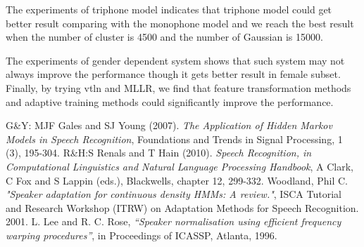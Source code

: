 \documentclass[]{article}
\begin{document}
\begin{multicols*}{2}
The experiments of triphone model indicates that triphone model could get better result comparing with the monophone model and we reach the best result when the number of cluster is 4500 and the number of Gaussian is 15000.

The experiments of gender dependent system shows that such system may not always improve the performance though it gets better result in female subset. Finally, by trying vtln and MLLR, we find that feature transformation methods and adaptive training methods could significantly improve the performance. 

\begin{thebibliography}{9}

  G\&Y: MJF Gales and SJ Young (2007).
  \emph{The Application of Hidden Markov Models in Speech Recognition},
  Foundations and Trends in Signal Processing,
  1 (3), 195-304.
  R\&H:S Renals and T Hain (2010).
  \emph{Speech Recognition, in Computational Linguistics and Natural Language Processing Handbook},
  A Clark, C Fox and S Lappin (eds.),
  Blackwells, chapter 12, 299-332.
  Woodland, Phil C.
  \emph{"Speaker adaptation for continuous density HMMs: A review."},
  ISCA Tutorial and Research Workshop (ITRW) on Adaptation Methods for Speech Recognition. 2001. 
   L. Lee and R. C. Rose, 
   \emph{“Speaker normalisation using efficient frequency warping procedures”},
   in Proceedings of ICASSP, Atlanta, 1996.

\end{thebibliography}

\end{multicols*}
\end{document}
